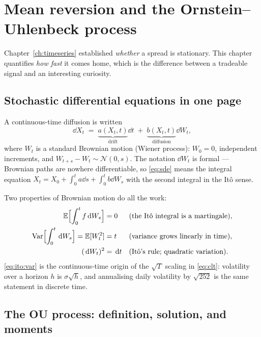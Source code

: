 \section{Mean reversion and the Ornstein--Uhlenbeck process}
\label{ch:ou}

Chapter~\ref{ch:timeseries} established \emph{whether} a spread is stationary. This
chapter quantifies \emph{how fast} it comes home, which is the difference between a
tradeable signal and an interesting curiosity.

\subsection{Stochastic differential equations in one page}
\label{sec:ou:sde}

A continuous-time diffusion is written
\begin{equation}
  \dd X_t \;=\; \underbrace{a(X_t,t)}_{\text{drift}}\dd t
  \;+\; \underbrace{b(X_t,t)}_{\text{diffusion}}\dd W_t ,
  \label{eq:sde}
\end{equation}
where $W_t$ is a standard Brownian motion (Wiener process): $W_0=0$, independent
increments, and $W_{t+s}-W_t\sim\mathcal N(0,s)$. The notation $\dd W_t$ is formal ---
Brownian paths are nowhere differentiable, so \eqref{eq:sde} means the integral equation
$X_t = X_0+\int_0^t a\dd s + \int_0^t b\dd W_s$ with the second integral in the Itô sense.

Two properties of Brownian motion do all the work:
\begin{align}
  \mathbb{E}\Bigl[\int_0^t f\,\mathrm{d} W_s\Bigr] &= 0 &&\text{(the Itô integral is a martingale)}, \label{eq:ito:mean}\\
  \operatorname{Var}\Bigl[\int_0^t \,\mathrm{d} W_s\Bigr] = \mathbb{E}[W_t^2] &= t &&\text{(variance grows linearly in time)}, \label{eq:ito:var}\\
  (\,\mathrm{d} W_t)^2 &= \,\mathrm{d} t &&\text{(Itô's rule; quadratic variation)}. \label{eq:ito:qvar}
\end{align}
\eqref{eq:ito:var} is the continuous-time origin of the $\sqrt T$ scaling in
\eqref{eq:clt}: volatility over a horizon $h$ is $\sigma\sqrt h$, and annualising daily
volatility by $\sqrt{252}$ is the same statement in discrete time.

\subsection{The OU process: definition, solution, and moments}
\label{sec:ou:definition}

